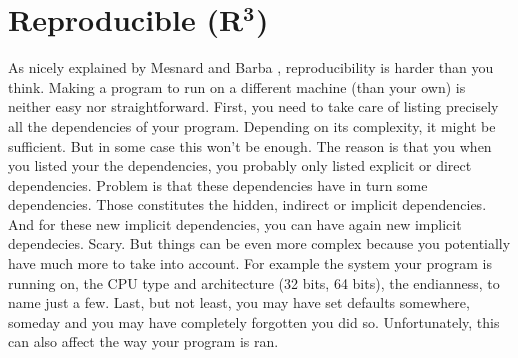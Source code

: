 \documentclass[a4paper,11pt]{article}
\begin{document}
\section*{Reproducible (R$^{\mathbf 3}$)}
As nicely explained by Mesnard and Barba \cite{Mesnard:2016}, reproducibility is harder than you think. 
Making a program to run on a different machine (than your own) is neither easy nor straightforward.
First, you need to take care of listing precisely all the dependencies of your program.
Depending on its complexity, it might be sufficient.
But in some case this won't be enough.
The reason is that you when you listed your the dependencies, you probably only listed explicit or direct dependencies.
Problem is that these dependencies have in turn some dependencies.
Those constitutes the hidden, indirect or implicit dependencies.
And for these new implicit dependencies, you can have again new implicit dependecies. Scary.
But things can be even more complex because you potentially have much more to take into account.
For example the system your program is running on, the CPU type and architecture (32 bits, 64 bits), the endianness, to name just a few.
Last, but not least, you may have set defaults somewhere, someday and you may have completely forgotten you did so. Unfortunately, this can also affect the way your program is ran.


\end{document}
